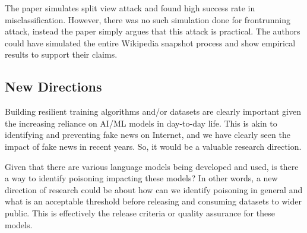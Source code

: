 \documentclass[12pt]{article}
\begin{document}
    The paper simulates split view attack and found high success rate in misclassification. However, there was no such simulation done for frontrunning attack, instead the paper simply argues that this attack is practical. The authors could have simulated the entire Wikipedia snapshot process and show empirical results to support their claims.

    \subsection*{New Directions}
    Building resilient training algorithms and/or datasets are clearly important given the increasing reliance on AI/ML models in day-to-day life. This is akin to identifying and preventing fake news on Internet, and we have clearly seen the impact of fake news in recent years. So, it would be a valuable research direction.

    Given that there are various language models being developed and used, is there a way to identify poisoning impacting these models? In other words, a new direction of research could be about how can we identify poisoning in general and what is an acceptable threshold before releasing and consuming datasets to wider public. This is effectively the release criteria or quality assurance for these models.
\end{document}
